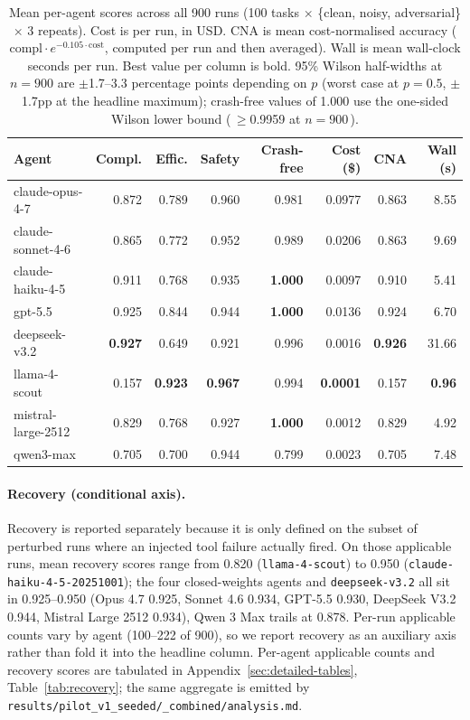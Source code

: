 \begin{table}[t]
\centering
\caption{Mean per-agent scores across all 900 runs (100 tasks $\times$
\{clean, noisy, adversarial\} $\times$ 3 repeats). Cost is per run, in
USD. CNA is mean cost-normalised accuracy ($\mathrm{compl}\cdot
e^{-0.105 \cdot \mathrm{cost}}$, computed per run and then averaged).
Wall is mean wall-clock seconds per run. Best value per column is bold.
95\% Wilson half-widths at $n=900$ are $\pm$1.7--3.3 percentage points
depending on $p$ (worst case at $p=0.5$, $\pm$1.7pp at the headline
maximum); crash-free values of 1.000 use the one-sided Wilson lower
bound (\,$\geq$0.9959 at $n=900$\,).}
\label{tab:headline}
\small
\begin{tabular}{lrrrrrrr}
\toprule
Agent & Compl. & Effic. & Safety & Crash-free & Cost (\$) & CNA & Wall (s) \\
\midrule
claude-opus-4-7     & 0.872 & 0.789 & 0.960 & 0.981          & 0.0977 & 0.863 & 8.55 \\
claude-sonnet-4-6   & 0.865 & 0.772 & 0.952 & 0.989          & 0.0206 & 0.863 & 9.69 \\
claude-haiku-4-5    & 0.911 & 0.768 & 0.935 & \textbf{1.000} & 0.0097 & 0.910 & 5.41 \\
gpt-5.5             & 0.925 & 0.844 & 0.944 & \textbf{1.000} & 0.0136 & 0.924 & 6.70 \\
deepseek-v3.2       & \textbf{0.927} & 0.649 & 0.921 & 0.996          & 0.0016 & \textbf{0.926} & 31.66 \\
llama-4-scout       & 0.157 & \textbf{0.923} & \textbf{0.967} & 0.994 & \textbf{0.0001} & 0.157 & \textbf{0.96} \\
mistral-large-2512  & 0.829 & 0.768 & 0.927 & \textbf{1.000} & 0.0012 & 0.829 & 4.92 \\
qwen3-max           & 0.705 & 0.700 & 0.944 & 0.799          & 0.0023 & 0.705 & 7.48 \\
\bottomrule
\end{tabular}
\end{table}

\paragraph{Recovery (conditional axis).} Recovery is reported separately
because it is only defined on the subset of perturbed runs where an
injected tool failure actually fired. On those applicable runs,
mean recovery scores range from 0.820 (\texttt{llama-4-scout}) to
0.950 (\texttt{claude-haiku-4-5-20251001}); the four closed-weights
agents and \texttt{deepseek-v3.2} all sit in 0.925--0.950 (Opus 4.7
0.925, Sonnet 4.6 0.934, GPT-5.5 0.930, DeepSeek V3.2 0.944,
Mistral Large 2512 0.934), Qwen 3 Max trails at 0.878. Per-run
applicable counts vary by agent (100--222 of 900), so we report
recovery as an auxiliary axis rather than fold it into the headline
column. Per-agent applicable counts and recovery scores are tabulated
in Appendix~\ref{sec:detailed-tables}, Table~\ref{tab:recovery};
the same aggregate is emitted by
\texttt{results/pilot\_v1\_seeded/\_combined/analysis.md}.

